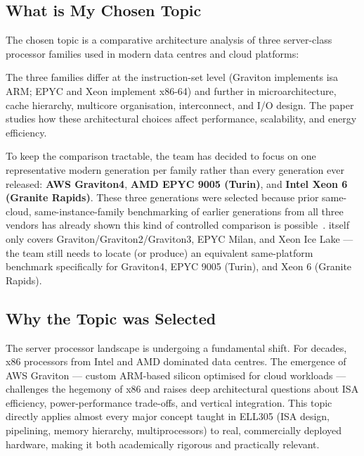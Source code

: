 \documentclass[12pt,a4paper]{article}
\begin{document}
\subsection{What is My Chosen Topic}
The chosen topic is a comparative architecture analysis of three
server-class processor families used in modern data centres and cloud
platforms:
\begin{center}
\end{center}
The three families differ at the instruction-set level (Graviton
implements \gls{isa} ARM; EPYC and
Xeon implement x86-64) and further in microarchitecture, cache
hierarchy, multicore organisation, interconnect, and I/O design. The
paper studies how these architectural choices affect performance,
scalability, and energy efficiency.

To keep the comparison tractable, the team has decided to focus on one
representative modern generation per family rather than every
generation ever released: \textbf{AWS Graviton4},
\textbf{AMD EPYC 9005 (Turin)}, and
\textbf{Intel Xeon 6 (Granite Rapids)}. These three generations were selected because prior
same-cloud, same-instance-family benchmarking of earlier generations
from all three vendors has already shown this kind of controlled
comparison is possible~\cite{phoronix2022}. \cite{phoronix2022} itself
only covers Graviton/Graviton2/Graviton3, EPYC Milan, and Xeon Ice
Lake --- the team still needs to locate (or produce) an equivalent
same-platform benchmark specifically for Graviton4, EPYC 9005 (Turin),
and Xeon 6 (Granite Rapids).

\subsection{Why the Topic was Selected}
The server processor landscape is undergoing a fundamental shift. For
decades, x86 processors from Intel and AMD dominated data centres. The
emergence of AWS Graviton --- custom ARM-based silicon optimised for
cloud workloads --- challenges the hegemony of x86 and raises deep
architectural questions about ISA efficiency, power-performance
trade-offs, and vertical integration. This topic directly applies
almost every major concept taught in ELL305 (ISA design, pipelining,
memory hierarchy, multiprocessors) to real, commercially deployed
hardware, making it both academically rigorous and practically
relevant.
\end{document}
